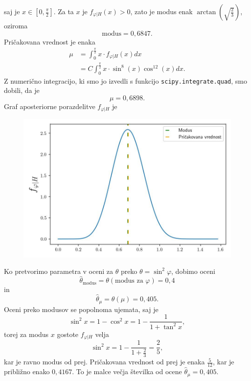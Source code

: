 \documentclass{article}
\begin{document}
saj je $x \in \left[0, \frac{\pi}{2}\right]$. Za ta $x$ je $f_{\varphi | H}(x) > 0$, zato je modus enak $\arctan(\sqrt{\frac{2}{3}})$, oziroma
\begin{equation*}
    \text{modus} = 0{,}6847.
\end{equation*}
Pričakovana vrednost je enaka
\begin{align*}
    \mu &= \int_0^{\frac{\pi}{2}}x \cdot f_{\varphi | H}(x) dx \\
    &= C \int_0^{\frac{\pi}{2}} x \cdot \sin^8 (x) \cos^{12}(x) dx.
\end{align*}
Z numerično integracijo, ki smo jo izvedli s funkcijo \texttt{scipy.integrate.quad}, smo dobili, da je 
\begin{equation*}
    \mu = 0{,}6898.
\end{equation*}
Graf aposteriorne porazdelitve $f_{\varphi | H}$ je
\begin{figure}[H]
    \centering
    \includegraphics[scale=0.7]{../rezultati/gostota_apos_2.jpg}
\end{figure}

Ko pretvorimo parametra v oceni za $\theta$ preko $\theta = \sin^2 \varphi$, dobimo oceni
\begin{equation*}
    \widehat{\theta}_{\text{modus}} = \theta(\text{modus za } \varphi) = 0{,}4
\end{equation*}
in
\begin{equation*}
    \widehat{\theta}_{\mu} = \theta(\mu) = 0{,}405.
\end{equation*}
Oceni preko modusov se popolnoma ujemata, saj je 
\begin{equation*}
    \sin^2 x = 1 - \cos^2x = 1 - \frac{1}{1 + \tan^2 x},
\end{equation*}
torej za modus $x$ gostote $f_{\varphi | H}$ velja 
\begin{equation*}
    \sin^2 x = 1 - \frac{1}{1 + \frac{2}{3}} = \frac{2}{5},
\end{equation*}
kar je ravno modus od prej. Pričakovana vrednost od prej je enaka $\frac{5}{12}$, kar je približno enako $0{,}4167$. To je malce večja številka od ocene $\widehat{\theta}_{\mu} = 0{,}405$.
\end{document}
